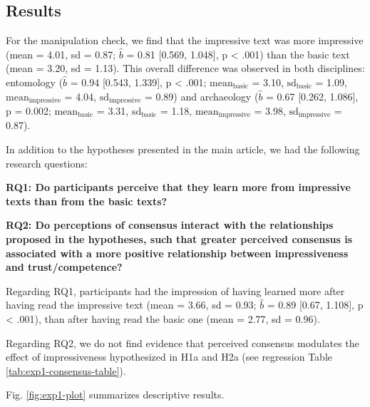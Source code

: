 \documentclass[
  english,
  doc,floatsintext]{apa6}
\begin{document}
\subsection{Results}\label{results}

For the manipulation check, we find that the impressive text was more impressive (mean = 4.01, sd = 0.87; \(\hat{b}\) = 0.81 {[}0.569, 1.048{]}, p \textless{} .001) than the basic text (mean = 3.20, sd = 1.13). This overall difference was observed in both disciplines: entomology (\(\hat{b}\) = 0.94 {[}0.543, 1.339{]}, p \textless{} .001; \(\text{mean}_{\text{basic}}\) = 3.10, \(\text{sd}_{\text{basic}}\) = 1.09, \(\text{mean}_{\text{impressive}}\) = 4.04, \(\text{sd}_{\text{impressive}}\) = 0.89) and archaeology (\(\hat{b}\) = 0.67 {[}0.262, 1.086{]}, p = 0.002; \(\text{mean}_{\text{basic}}\) = 3.31, \(\text{sd}_{\text{basic}}\) = 1.18, \(\text{mean}_{\text{impressive}}\) = 3.98, \(\text{sd}_{\text{impressive}}\) = 0.87).

In addition to the hypotheses presented in the main article, we had the following research questions:

\textbf{RQ1: Do participants perceive that they learn more from impressive texts than from the basic texts?}

\textbf{RQ2: Do perceptions of consensus interact with the relationships proposed in the hypotheses, such that greater perceived consensus is associated with a more positive relationship between impressiveness and trust/competence?}

Regarding RQ1, participants had the impression of having learned more after having read the impressive text (mean = 3.66, sd = 0.93; \(\hat{b}\) = 0.89 {[}0.67, 1.108{]}, p \textless{} .001), than after having read the basic one (mean = 2.77, sd = 0.96).

Regarding RQ2, we do not find evidence that perceived consensus modulates the effect of impressiveness hypothesized in H1a and H2a (see regression Table \ref{tab:exp1-consensus-table}).

Fig. \ref{fig:exp1-plot} summarizes descriptive results.
\end{document}
